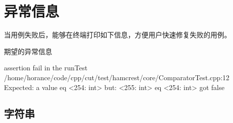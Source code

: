 \begin{savequote}[45mm]
\end{savequote}

\chapter{异常信息} 
\label{ch:except-msg}

\begin{content}

当用例失败后，能够在终端打印如下信息，方便用户快速修复失败的用例。

\begin{nodiff}{期望的异常信息}
 \begin{c++}
assertion fail in the runTest
/home/horance/code/cpp/cut/test/hamcrest/core/ComparatorTest.cpp:12
Expected: a value eq <254: int>
     but: <255: int> eq <254: int> got false
 \end{c++}
\end{nodiff}

\end{content}

\section{字符串}

